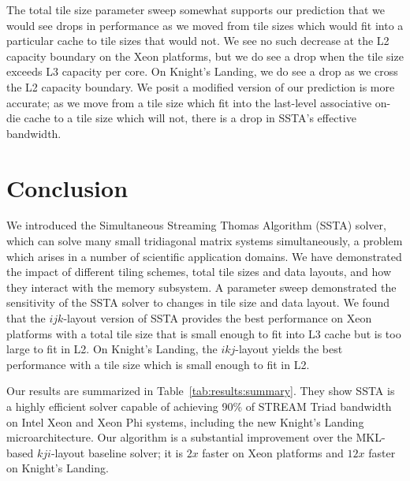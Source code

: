 \documentclass{sig-alternate}
\newcommand{\textapprox}{\texttildelow}
\begin{document}
The total tile size parameter sweep somewhat supports our prediction that we
  would see drops in performance as we moved from tile sizes which would
  fit into a particular cache to tile sizes that would not.
We see no such decrease at the L2 capacity boundary on the Xeon platforms, but
  we do see a drop when the tile size exceeds L3 capacity per core.
On Knight's Landing, we do see a drop as we cross the L2 capacity boundary.
We posit a modified version of our prediction is more accurate; as we move from
  a tile size which fit into the last-level associative on-die cache to a tile
  size which will not, there is a drop in SSTA's effective bandwidth.

\section{Conclusion}
\label{sec:conclusion}


We introduced the Simultaneous Streaming Thomas Algorithm (SSTA) solver, which
  can solve many small tridiagonal matrix systems simultaneously, a
  problem which arises in a number of scientific application domains.
We have demonstrated the impact of different tiling schemes, total tile sizes
  and data layouts, and how they interact with the memory subsystem.
A parameter sweep demonstrated the sensitivity of the SSTA solver to changes in
  tile size and data layout.
We found that the \(ijk\)-layout version of SSTA provides the best performance
  on Xeon platforms with a total tile size that is small enough to fit into 
  L3 cache but is too large to fit in L2.
On Knight's Landing, the \(ikj\)-layout yields the best performance with a
  tile size which is small enough to fit in L2.

Our results are summarized in Table~\ref{tab:results:summary}.
They show SSTA is a highly efficient solver capable of achieving 90\%
  of STREAM Triad bandwidth on Intel Xeon and Xeon Phi systems, including the new
  Knight's Landing microarchitecture.
Our algorithm is a substantial improvement over the MKL-based \(kji\)-layout
  baseline solver; it is \textapprox \(2x\) faster on Xeon platforms and
  \textapprox \(12x\) faster on Knight's Landing.
\end{document}
